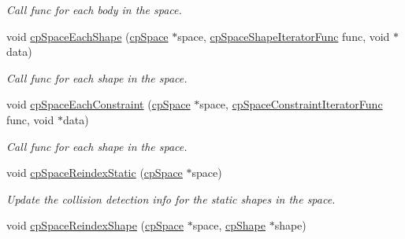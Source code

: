 \begin{DoxyCompactItemize}
\begin{DoxyCompactList}\small\item\em Call {\ttfamily func} for each body in the space. \end{DoxyCompactList}\item 
\hypertarget{group__cp_space_gac652c40a648d64651b4b36baab354802}{void \hyperlink{group__cp_space_gac652c40a648d64651b4b36baab354802}{cp\-Space\-Each\-Shape} (\hyperlink{structcp_space}{cp\-Space} $\ast$space, \hyperlink{group__cp_space_ga780ed0f29f957005efb4e24df64883b2}{cp\-Space\-Shape\-Iterator\-Func} func, void $\ast$data)}\label{group__cp_space_gac652c40a648d64651b4b36baab354802}

\begin{DoxyCompactList}\small\item\em Call {\ttfamily func} for each shape in the space. \end{DoxyCompactList}\item 
\hypertarget{group__cp_space_gac388d8f773c2e080b214734af63a5b64}{void \hyperlink{group__cp_space_gac388d8f773c2e080b214734af63a5b64}{cp\-Space\-Each\-Constraint} (\hyperlink{structcp_space}{cp\-Space} $\ast$space, \hyperlink{group__cp_space_ga6818e027bac76ed80432f12ffc8d7a39}{cp\-Space\-Constraint\-Iterator\-Func} func, void $\ast$data)}\label{group__cp_space_gac388d8f773c2e080b214734af63a5b64}

\begin{DoxyCompactList}\small\item\em Call {\ttfamily func} for each shape in the space. \end{DoxyCompactList}\item 
\hypertarget{group__cp_space_gad703cfe24cb148c49c6dd30aa6b091ff}{void \hyperlink{group__cp_space_gad703cfe24cb148c49c6dd30aa6b091ff}{cp\-Space\-Reindex\-Static} (\hyperlink{structcp_space}{cp\-Space} $\ast$space)}\label{group__cp_space_gad703cfe24cb148c49c6dd30aa6b091ff}

\begin{DoxyCompactList}\small\item\em Update the collision detection info for the static shapes in the space. \end{DoxyCompactList}\item 
\hypertarget{group__cp_space_ga4dfab7bb0c43e49b321a5620c459f9d2}{void \hyperlink{group__cp_space_ga4dfab7bb0c43e49b321a5620c459f9d2}{cp\-Space\-Reindex\-Shape} (\hyperlink{structcp_space}{cp\-Space} $\ast$space, \hyperlink{structcp_shape}{cp\-Shape} $\ast$shape)}\label{group__cp_space_ga4dfab7bb0c43e49b321a5620c459f9d2}


\end{DoxyCompactItemize}
